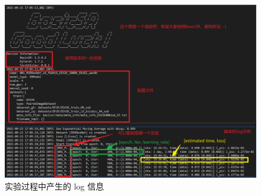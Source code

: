 \documentclass[../main.tex]{subfiles}
\begin{document}
\begin{figure}[htb]
    \begin{center}
        \includegraphics[width=0.9\linewidth]{figures/code_structure_log_example.png}
        \caption{实验过程中产生的 log 信息}
        \label{fig:getting_start_6}
    \end{center}
    \vspace{-0.5cm}
\end{figure}
\end{document}
